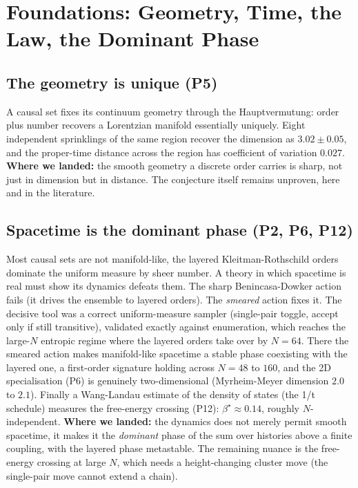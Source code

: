 \section{Foundations: Geometry, Time, the Law, the Dominant Phase}
\label{sec:foundations}

\subsection{The geometry is unique (P5)}

A causal set fixes its continuum geometry through the Hauptvermutung: order plus number
recovers a Lorentzian manifold essentially uniquely. Eight independent sprinklings of
the same region recover the dimension as $3.02 \pm 0.05$, and the proper-time distance
across the region has coefficient of variation $0.027$. \textbf{Where we landed:} the
smooth geometry a discrete order carries is sharp, not just in dimension but in
distance. The conjecture itself remains unproven, here and in the literature.

\subsection{Spacetime is the dominant phase (P2, P6, P12)}

Most causal sets are not manifold-like, the layered Kleitman-Rothschild orders dominate
the uniform measure by sheer number. A theory in which spacetime is real must show its
dynamics defeats them. The sharp Benincasa-Dowker action fails (it drives the ensemble
to layered orders). The \emph{smeared} action fixes it. The decisive tool was a correct
uniform-measure sampler (single-pair toggle, accept only if still transitive),
validated exactly against enumeration, which reaches the large-$N$ entropic regime where
the layered orders take over by $N=64$. There the smeared action makes manifold-like
spacetime a stable phase coexisting with the layered one, a first-order signature
holding across $N=48$ to $160$, and the 2D specialisation (P6) is genuinely
two-dimensional (Myrheim-Meyer dimension $2.0$ to $2.1$). Finally a Wang-Landau
estimate of the density of states (the 1/t schedule) measures the free-energy crossing
(P12): $\beta^\star \approx 0.14$, roughly $N$-independent. \textbf{Where we landed:}
the dynamics does not merely permit smooth spacetime, it makes it the \emph{dominant}
phase of the sum over histories above a finite coupling, with the layered phase
metastable. The remaining nuance is the free-energy crossing at large $N$, which needs
a height-changing cluster move (the single-pair move cannot extend a chain).

